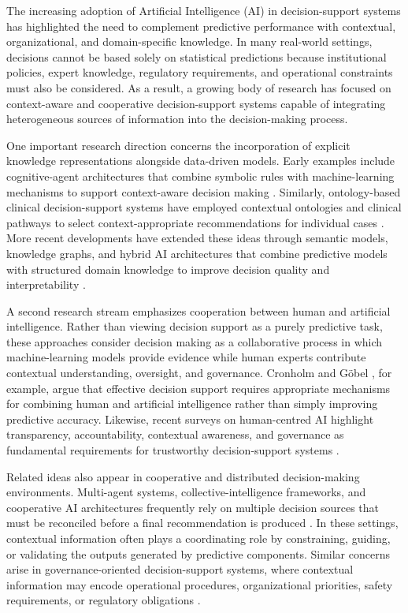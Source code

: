 \documentclass[mathematics,article,submit,moreauthors]{Definitions/mdpi}
\begin{document}
The increasing adoption of Artificial Intelligence (AI) in decision-support systems has highlighted the need to complement predictive performance with contextual, organizational, and domain-specific knowledge. In many real-world settings, decisions cannot be based solely on statistical predictions because institutional policies, expert knowledge, regulatory requirements, and operational constraints must also be considered. As a result, a growing body of research has focused on context-aware and cooperative decision-support systems capable of integrating heterogeneous sources of information into the decision-making process.

One important research direction concerns the incorporation of explicit knowledge representations alongside data-driven models. Early examples include cognitive-agent architectures that combine symbolic rules with machine-learning mechanisms to support context-aware decision making \citep{TengTan2008}. Similarly, ontology-based clinical decision-support systems have employed contextual ontologies and clinical pathways to select context-appropriate recommendations for individual cases \citep{YaoKumar2012}. More recent developments have extended these ideas through semantic models, knowledge graphs, and hybrid AI architectures that combine predictive models with structured domain knowledge to improve decision quality and interpretability \citep{AbuRasheed2024,Casado2025Governance}.

A second research stream emphasizes cooperation between human and artificial intelligence. Rather than viewing decision support as a purely predictive task, these approaches consider decision making as a collaborative process in which machine-learning models provide evidence while human experts contribute contextual understanding, oversight, and governance. Cronholm and G\"obel \citep{CronholmGoebel2022}, for example, argue that effective decision support requires appropriate mechanisms for combining human and artificial intelligence rather than simply improving predictive accuracy. Likewise, recent surveys on human-centred AI highlight transparency, accountability, contextual awareness, and governance as fundamental requirements for trustworthy decision-support systems \citep{Fanfani2025Human}.

Related ideas also appear in cooperative and distributed decision-making environments. Multi-agent systems, collective-intelligence frameworks, and cooperative AI architectures frequently rely on multiple decision sources that must be reconciled before a final recommendation is produced \citep{Smirnov2021Methodology}. In these settings, contextual information often plays a coordinating role by constraining, guiding, or validating the outputs generated by predictive components. Similar concerns arise in governance-oriented decision-support systems, where contextual information may encode operational procedures, organizational priorities, safety requirements, or regulatory obligations \citep{Marot2022Perspectives,Casado2025Governance}.
\end{document}
